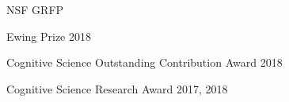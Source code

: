 

\iftrue
{}

\begin{cvhonors}
  \cvhonor
    {NSF GRFP} %
    {} %
    {} %

\end{cvhonors}
\fi



\begin{cvhonors}

  \cvhonor
    {Ewing Prize} %
    {} %
    {2018} %

  \cvhonor
    {Cognitive Science Outstanding Contribution Award} %
    {} %
    {2018} %

  \cvhonor
    {Cognitive Science Research Award} %
    {} %
    {2017, 2018} %

\end{cvhonors}

\iffalse

\cvsubsection{Not Funded}

\begin{cvhonors}

  \cvhonor
    {3rd Place} %
    {WITHCON Hacking Competition Final} %
    {Seoul, S.Korea} %
    {2015} %

  \cvhonor
    {Silver Prize} %
    {KISA HDCON Hacking Competition Final} %
    {Seoul, S.Korea} %
    {2017} %

\end{cvhonors}
\fi

